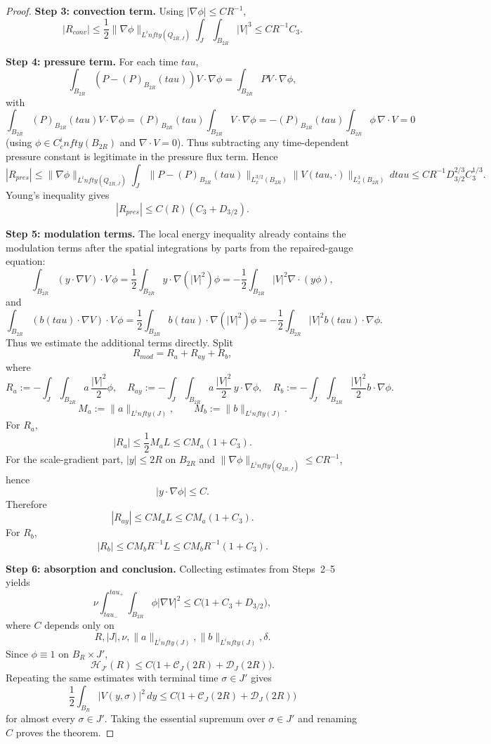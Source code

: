 \documentclass[11pt]{amsart}
\def\mathrm#1{#1}%
\def\tau{tau}%
\def\infty{infty}%
\theoremstyle{plain}
\theoremstyle{definition}
\theoremstyle{remark}
\begin{document}
\begin{proof}
\textbf{Step 3: convection term.}
Using $|\nabla\phi|\le CR^{-1}$,
\[
|R_{\mathrm{conv}}|
\le \frac12\|\nabla\phi\|_{L^\infty(Q_{2R,J})}\int_J\!\int_{B_{2R}}|V|^3
\le CR^{-1}C_3.
\]

\textbf{Step 4: pressure term.}
For each time $\tau$,
\[
\int_{B_{2R}}(P-(P)_{B_{2R}}(\tau))V\cdot \nabla\phi
=\int_{B_{2R}}PV\cdot \nabla\phi,
\]
with
\[
\int_{B_{2R}}(P)_{B_{2R}}(\tau)V\cdot \nabla\phi
=(P)_{B_{2R}}(\tau)\int_{B_{2R}}V\cdot \nabla\phi
=-(P)_{B_{2R}}(\tau)\int_{B_{2R}}\phi\,\nabla\cdot V=0
\]
(using $\phi\in C_c^\infty(B_{2R})$ and $\nabla\cdot V=0$).
Thus subtracting any time-dependent pressure constant is legitimate in the
pressure flux term.
Hence
\[
|R_{\mathrm{pres}}|
\le\|\nabla\phi\|_{L^\infty(Q_{2R,J})}
\int_J
\|P-(P)_{B_{2R}}(\tau)\|_{L_x^{3/2}(B_{2R})}
\|V(\tau,\cdot)\|_{L_x^3(B_{2R})}
\,d\tau
\le CR^{-1}D_{3/2}^{2/3}C_3^{1/3}.
\]
Young's inequality gives
\[
|R_{\mathrm{pres}}|\le C(R)(C_3+D_{3/2}).
\]

\textbf{Step 5: modulation terms.}
The local energy inequality already contains the modulation terms
after the spatial integrations by parts from the repaired-gauge equation:
\[
\int_{B_{2R}}(y\cdot\nabla V)\cdot V\,\phi
=\frac12\int_{B_{2R}}y\cdot\nabla(|V|^2)\phi
=-\frac12\int_{B_{2R}}|V|^2\nabla\cdot(y\phi),
\]
and
\[
\int_{B_{2R}}(b(\tau)\cdot\nabla V)\cdot V\,\phi
=\frac12\int_{B_{2R}}b(\tau)\cdot\nabla(|V|^2)\phi
=-\frac12\int_{B_{2R}}|V|^2b(\tau)\cdot\nabla\phi.
\]
Thus we estimate the additional terms directly. Split
\[
R_{\mathrm{mod}}=R_a+R_{ay}+R_b,
\]
where
\[
R_a:=-\int_J\!\int_{B_{2R}}a\,\frac{|V|^2}{2}\phi,
\quad
R_{ay}:=-\int_J\!\int_{B_{2R}}a\,\frac{|V|^2}{2}\,y\cdot\nabla\phi,
\quad
R_b:=-\int_J\!\int_{B_{2R}}\frac{|V|^2}{2}b\cdot\nabla\phi.
\]
\[
M_a:=\|a\|_{L^\infty(J)},\qquad M_b:=\|b\|_{L^\infty(J)}.
\]
For $R_a$,
\[
|R_a|
\le \frac12 M_aL
\le C M_a(1+C_3).
\]
For the scale-gradient part, $|y|\le2R$ on $B_{2R}$ and
$\|\nabla\phi\|_{L^\infty(Q_{2R,J})}\le CR^{-1}$, hence
\[
|y\cdot\nabla\phi|\le C.
\]
Therefore
\[
|R_{ay}|\le C M_aL\le C M_a(1+C_3).
\]
For $R_b$,
\[
|R_b|\le C M_bR^{-1}L\le C M_bR^{-1}(1+C_3).
\]

\textbf{Step 6: absorption and conclusion.}
Collecting estimates from Steps~2--5 yields
\[
\nu\int_{\tau_-}^{\tau_+}\!\int_{B_{2R}}\phi|\nabla V|^2
\le C\bigl(1+C_3+D_{3/2}\bigr),
\]
where $C$ depends only on
\[
R,|J|,\nu,\|a\|_{L^\infty(J)},\|b\|_{L^\infty(J)},\delta.
\]
Since $\phi\equiv1$ on $B_R\times J'$,
\[
\mathcal H_{J'}(R)
\le C\bigl(1+\mathcal C_J(2R)+\mathcal D_J(2R)\bigr).
\]
Repeating the same estimates with terminal time $\sigma\in J'$ gives
\[
\frac12\int_{B_R}|V(y,\sigma)|^2\,dy
\le C\bigl(1+\mathcal C_J(2R)+\mathcal D_J(2R)\bigr)
\]
for almost every $\sigma\in J'$. Taking the essential supremum over
$\sigma\in J'$ and renaming $C$ proves the theorem.
\end{proof}
\end{document}
